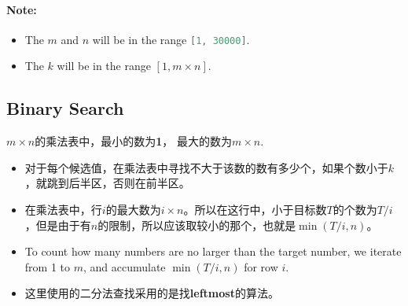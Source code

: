 \paragraph{Note:}

\begin{itemize}
\item The $m$ and $n$ will be in the range \lstinline[language=C++, basicstyle=\small\ttfamily, keywordstyle=\bfseries\color{green!40!black}]|[1, 30000]|.
\item The $k$ will be in the range $[1, m\times n]$.
\end{itemize}

\subsection{Binary Search}
$m \times n$的乘法表中，最小的数为\textbf{1}， 最大的数为$m\times n$.
\begin{itemize}
\item 对于每个候选值，在乘法表中寻找不大于该数的数有多少个，如果个数小于$k$，就跳到后半区，否则在前半区。
\item 在乘法表中，行$i$的最大数为$ i \times n$。所以在这行中，小于目标数$T$的个数为$ T / i$，但是由于有$n$的限制，所以应该取较小的那个，也就是$\min(T/i, n)$。
\item To count how many numbers are no larger than the target number, we iterate from 1 to $m$, and accumulate $\min(T/i, n)$ for row $i$.
\item 这里使用的二分法查找采用的是找\textbf{leftmost}的算法。
\end{itemize}